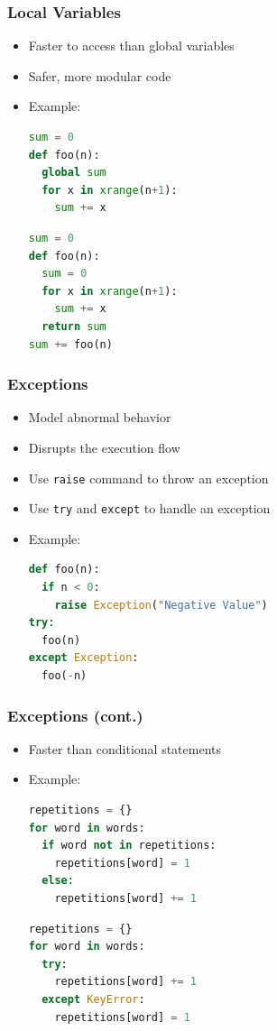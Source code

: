 \documentclass[xcolor=table,10pt,final]{beamer}
\begin{document}
\begin{frame}[fragile]
	\frametitle{Local Variables}
	\begin{itemize}
		\item Faster to access than global variables
		\item Safer, more modular code
		\item Example:
			\begin{lstlisting}[language=Python]
sum = 0
def foo(n):
  global sum
  for x in xrange(n+1):
    sum += x
			\end{lstlisting}
			\begin{lstlisting}[language=Python]
sum = 0
def foo(n):
  sum = 0
  for x in xrange(n+1):
    sum += x
  return sum
sum += foo(n)
			\end{lstlisting}
	\end{itemize}
\end{frame}

\begin{frame}[fragile]
	\frametitle{Exceptions}
	\begin{itemize}
		\item Model abnormal behavior
		\item Disrupts the execution flow 
		\item Use {\tt raise} command to throw an exception
		\item Use {\tt try} and {\tt except} to handle an exception
		\item Example:
			\begin{lstlisting}[language=Python]
def foo(n):
  if n < 0:
    raise Exception("Negative Value")
try:
  foo(n)
except Exception:
  foo(-n)
			\end{lstlisting}
	\end{itemize}
\end{frame}

\begin{frame}[fragile]
	\frametitle{Exceptions (cont.)}
	\begin{itemize}
		\item Faster than conditional statements
		\item Example:
			\begin{lstlisting}[language=Python]
repetitions = {}
for word in words:
  if word not in repetitions:
    repetitions[word] = 1
  else:
    repetitions[word] += 1
			\end{lstlisting}
			\begin{lstlisting}[language=Python]
repetitions = {}
for word in words:
  try:
    repetitions[word] += 1
  except KeyError:
    repetitions[word] = 1
			\end{lstlisting}
	\end{itemize}
\end{frame}
\end{document}
